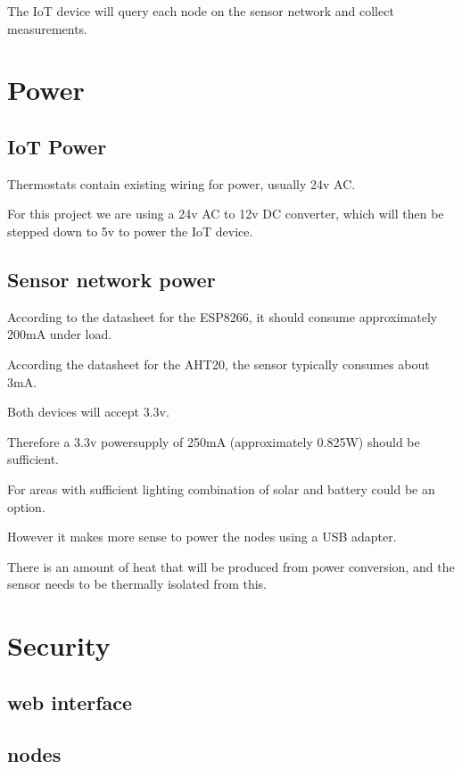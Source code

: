 \documentclass[journal]{IEEEtran} %
\begin{document}
The IoT device will query each node on the sensor network and collect measurements.


\section{Power}

\subsection{IoT Power}

Thermostats contain existing wiring for power, usually 24v AC.

For this project we are using a 24v AC to 12v DC converter, 
which will then be stepped down to 5v to power the IoT device.


\subsection{Sensor network power}

According to the datasheet for the ESP8266, it should consume approximately 200mA under load.

According the datasheet for the AHT20, the sensor typically consumes about 3mA.

Both devices will accept 3.3v.

Therefore a 3.3v powersupply of 250mA (approximately 0.825W) should be sufficient.

For areas with sufficient lighting combination of solar and battery could be an option.

However it makes more sense to power the nodes using a USB adapter.

There is an amount of heat that will be produced from power conversion,
and the sensor needs to be thermally isolated from this.


\section{Security}

\subsection{web interface}

\subsection{nodes}
\end{document}
